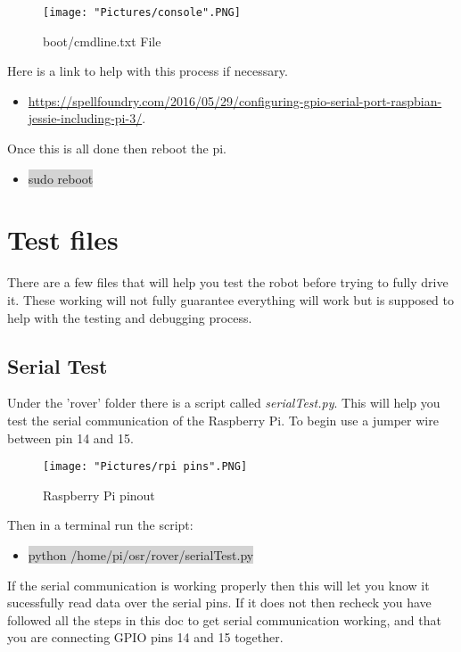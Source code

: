 \documentclass[12pt]{article}
\begin{document}
\begin{figure}[H]
 	\centering
	\texttt{[image: "Pictures/console".PNG]}
 	\caption{boot/cmdline.txt File}
	\label{console}
\end{figure}

\noindent Here is a link to help with this process if necessary.
\begin{itemize}
	\item \href{https://spellfoundry.com/2016/05/29/configuring-gpio-serial-port-raspbian-jessie-including-pi-3/}{https://spellfoundry.com/2016/05/29/configuring-gpio-serial-port-raspbian-jessie-including-pi-3/}. 
\end{itemize}
\noindent Once this is all done then reboot the pi.
\begin{itemize}
	\item[] \colorbox{lightgray}{sudo reboot}
\end{itemize}


\section{Test files}
There are a few files that will help you test the robot before trying to fully drive it. These working will not fully guarantee everything will work but is supposed to help with the testing and debugging process.

\subsection{Serial Test}

Under the 'rover' folder there is a script called \textit{serialTest.py}. This will help you test the serial communication of the Raspberry Pi. To begin use a jumper wire between pin 14 and 15. 

\begin{figure}[H]
 	\centering
	\texttt{[image: "Pictures/rpi pins".PNG]}
 	\caption{Raspberry Pi pinout}
	\label{rpi pin}
\end{figure}


Then in a terminal run the script:
\begin{itemize}
	\item[] \colorbox{lightgray}{python /home/pi/osr/rover/serialTest.py}
\end{itemize}

If the serial communication is working properly then this will let you know it sucessfully read data over the serial pins. If it does not then recheck you have followed all the steps in this doc to get serial communication working, and that you are connecting GPIO pins 14 and 15 together. 
\end{document}
